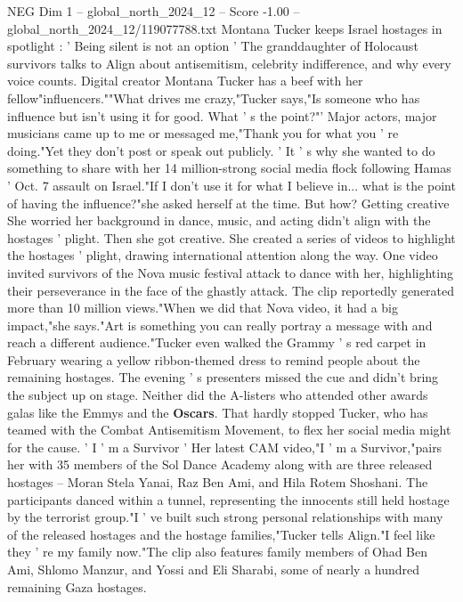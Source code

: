 \begin{textsample}{NEG Dim 1 – global\_north\_2024\_12 – Score -1.00 – global\_north\_2024\_12/119077788.txt}  \label{ex:f1_neg_190}
Montana Tucker keeps Israel hostages in spotlight : ' Being silent is not an option ' The granddaughter of Holocaust survivors talks to Align about antisemitism, celebrity indifference, and why every voice counts.
Digital creator Montana Tucker has a beef with her fellow"influencers.""What drives me crazy,"Tucker says,"Is someone who has influence but isn't using it for good.
What ' s the point?"' Major actors, major musicians came up to me or messaged me,"Thank you for what you ' re doing."Yet they don't post or speak out publicly. ' It ' s why she wanted to do something to share with her 14 million-strong social media flock following Hamas ' Oct. 7 assault on Israel."If I don't use it for what I believe in... what is the point of having the influence?"she asked herself at the time.
But how?
Getting creative She worried her background in dance, music, and acting didn't align with the hostages ' plight.
Then she got creative.
She created a series of videos to highlight the hostages ' plight, drawing international attention along the way.
One video invited survivors of the Nova music festival attack to dance with her, highlighting their perseverance in the face of the ghastly attack.
The clip reportedly generated more than 10 million views."When we did that Nova video, it had a big impact,"she says."Art is something you can really portray a message with and reach a different audience."Tucker even walked the Grammy ' s red carpet in February wearing a yellow ribbon-themed dress to remind people about the remaining hostages.
The evening ' s presenters missed the cue and didn't bring the subject up on stage.
Neither did the A-listers who attended other awards galas like the Emmys and the \textbf{Oscars}.
That hardly stopped Tucker, who has teamed with the Combat Antisemitism Movement, to flex her social media might for the cause. ' I ' m a Survivor ' Her latest CAM video,"I ' m a Survivor,"pairs her with 35 members of the Sol Dance Academy along with are three released hostages -- Moran Stela Yanai, Raz Ben Ami, and Hila Rotem Shoshani.
The participants danced within a tunnel, representing the innocents still held hostage by the terrorist group."I ' ve built such strong personal relationships with many of the released hostages and the hostage families,"Tucker tells Align."I feel like they ' re my family now."The clip also features family members of Ohad Ben Ami, Shlomo Manzur, and Yossi and Eli Sharabi, some of nearly a hundred remaining Gaza hostages.

\end{textsample}

